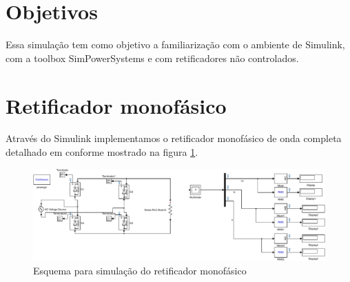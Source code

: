 \documentclass{report}
\begin{document}


\onehalfspacing
\section{Objetivos}
	Essa simulação tem como objetivo a familiarização com o ambiente de Simulink, com a toolbox SimPowerSystems e com retificadores não controlados.
	 
\section{Retificador monofásico}
Através do Simulink implementamos o retificador monofásico de onda completa detalhado em \cite{bb:roteirosim1} conforme mostrado na figura \ref{fig:msim}.
\begin{figure}[H]
	\centering
	\includegraphics[width=\linewidth]{matlab/mono_sim}
	\caption{Esquema para simulação do retificador monofásico}
	\label{fig:msim}
\end{figure}
\end{document}
